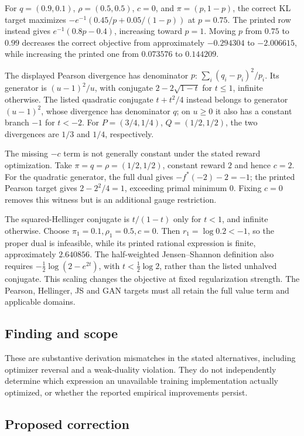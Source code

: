 \documentclass[11pt]{article}
\begin{document}
For \(q=(0.9,0.1)\), \(\rho=(0.5,0.5)\), \(c=0\), and \(\pi=(p,1-p)\), the correct KL target maximizes \(-e^{-1}(0.45/p+0.05/(1-p))\) at \(p=0.75\). The printed row instead gives \(e^{-1}(0.8p-0.4)\), increasing toward \(p=1\). Moving \(p\) from \(0.75\) to \(0.99\) decreases the correct objective from approximately \(-0.294304\) to \(-2.006615\), while increasing the printed one from \(0.073576\) to \(0.144209\).

The displayed Pearson divergence has denominator \(p\): \(\sum_i(q_i-p_i)^2/p_i\). Its generator is \((u-1)^2/u\), with conjugate \(2-2\sqrt{1-t}\) for \(t\le1\), infinite otherwise. The listed quadratic conjugate \(t+t^2/4\) instead belongs to generator \((u-1)^2\), whose divergence has denominator \(q\); on \(u\ge0\) it also has a constant branch \(-1\) for \(t<-2\). For \(P=(3/4,1/4)\), \(Q=(1/2,1/2)\), the two divergences are \(1/3\) and \(1/4\), respectively.

The missing \(-c\) term is not generally constant under the stated reward optimization. Take \(\pi=q=\rho=(1/2,1/2)\), constant reward \(2\) and hence \(c=2\). For the quadratic generator, the full dual gives \(-f^*(-2)-2=-1\); the printed Pearson target gives \(2-2^2/4=1\), exceeding primal minimum \(0\). Fixing \(c=0\) removes this witness but is an additional gauge restriction.

The squared-Hellinger conjugate is \(t/(1-t)\) only for \(t<1\), and infinite otherwise. Choose \(\pi_1=0.1,\rho_1=0.5,c=0\). Then \(r_1=\log0.2<-1\), so the proper dual is infeasible, while its printed rational expression is finite, approximately \(2.640856\). The half-weighted Jensen–Shannon definition also requires \(-\frac12\log(2-e^{2t})\), with \(t<\frac12\log2\), rather than the listed unhalved conjugate. This scaling changes the objective at fixed regularization strength. The Pearson, Hellinger, JS and GAN targets must all retain the full value term and applicable domains.

\subsection*{Finding and scope}

These are substantive derivation mismatches in the stated alternatives, including optimizer reversal and a weak-duality violation. They do not independently determine which expression an unavailable training implementation actually optimized, or whether the reported empirical improvements persist.

\subsection*{Proposed correction}
\end{document}
